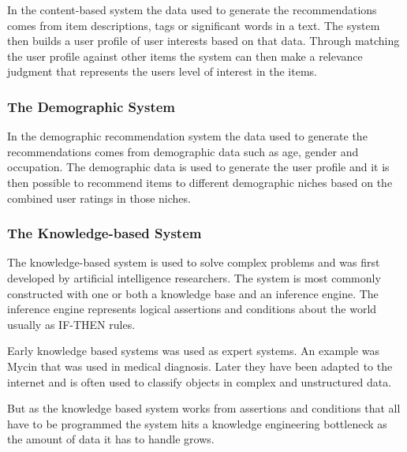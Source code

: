 In the content-based system the data used to generate the recommendations comes from item descriptions, tags or significant words in a text. The system then builds a user profile of user interests based on that data. Through matching the user profile against other items the system can then make a relevance judgment that represents the users level of interest in the items. \cite{RecSysHandbook}


\subsubsection{The Demographic System}

In the demographic recommendation system the data used to generate the recommendations comes from demographic data such as age, gender and occupation. The demographic data is used to generate the user profile and it is then possible to recommend items to different demographic niches based on the combined user ratings in those niches. \cite{recWikipedia}


\subsubsection{The Knowledge-based System}

The knowledge-based system is used to solve complex problems and was first developed by artificial intelligence researchers. The system is most commonly constructed with one or both a knowledge base  and an inference engine. The inference engine represents logical assertions and conditions about the world usually as IF-THEN rules.

Early knowledge based systems was used as expert systems. An example was Mycin that was used in medical diagnosis. Later they have been adapted to the internet and is often used to classify objects in complex and unstructured data.

But as the knowledge based system works from assertions and conditions that all have to be programmed the system hits a knowledge engineering bottleneck as the amount of data it has to handle grows. \cite{knowledgeWikipedia}

